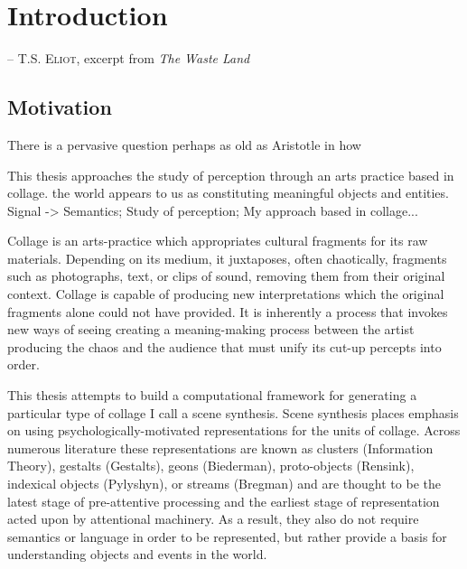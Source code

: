 \chapter{Introduction}
\label{chap:intro}
\minitoc


\epigraph{}%
{-- \textsc{T.S. Eliot}, excerpt from \textit{The Waste Land}}%

\section{Motivation}

There is a pervasive question perhaps as old as Aristotle in how 

This thesis approaches the study of perception through an arts practice based in collage.  the world appears to us as constituting meaningful objects and entities.  Signal -> Semantics; Study of perception; My approach based in collage... 

Collage is an arts-practice which appropriates cultural fragments for its raw materials.  Depending on its medium, it juxtaposes, often chaotically, fragments such as photographs, text, or clips of sound, removing them from their original context.  Collage is capable of producing new interpretations which the original fragments alone could not have provided.  It is inherently a process that invokes new ways of seeing creating a meaning-making process between the artist producing the chaos and the audience that must unify its cut-up percepts into order.  %


This thesis attempts to build a computational framework for generating a particular type of collage I call a scene synthesis.  Scene synthesis places emphasis on using psychologically-motivated representations for the units of collage.  Across numerous literature these representations are known as clusters (Information Theory), gestalts (Gestalts), geons (Biederman), proto-objects (Rensink), indexical objects (Pylyshyn), or streams (Bregman) and are thought to be the latest stage of pre-attentive processing and the earliest stage of representation acted upon by attentional machinery.  As a result, they also do not require semantics or language in order to be represented, but rather provide a basis for understanding objects and events in the world.  

